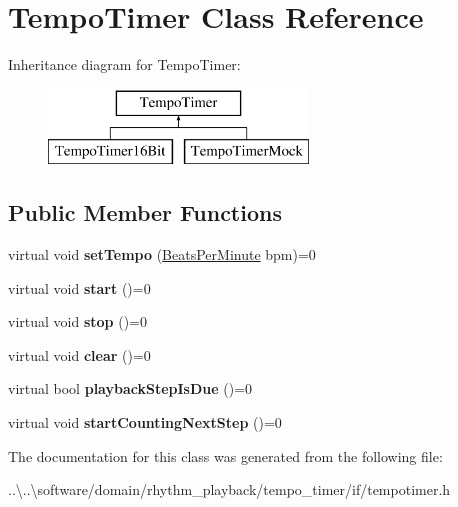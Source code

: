 \hypertarget{class_tempo_timer}{}\section{Tempo\+Timer Class Reference}
\label{class_tempo_timer}
Inheritance diagram for Tempo\+Timer\+:\begin{figure}[H]
\begin{center}
\leavevmode
\includegraphics[height=2.000000cm]{class_tempo_timer}
\end{center}
\end{figure}
\subsection*{Public Member Functions}
\begin{DoxyCompactItemize}
\item 
\mbox{\label{class_tempo_timer_a7becbb115ca987ae7629f6cb40f6824c}} 
virtual void {\bfseries set\+Tempo} (\mbox{\hyperlink{class_beats_per_minute}{Beats\+Per\+Minute}} bpm)=0
\item 
\mbox{\label{class_tempo_timer_aa33c53fa2a53e985d833c48a54a6b31c}} 
virtual void {\bfseries start} ()=0
\item 
\mbox{\label{class_tempo_timer_addd234d765f7b39bd26da5bc09bf9e0a}} 
virtual void {\bfseries stop} ()=0
\item 
\mbox{\label{class_tempo_timer_a2ae88d3a0e961dd42577b8b93e1ab6df}} 
virtual void {\bfseries clear} ()=0
\item 
\mbox{\label{class_tempo_timer_ac0241c95a4c094bf62aede38cf9de595}} 
virtual bool {\bfseries playback\+Step\+Is\+Due} ()=0
\item 
\mbox{\label{class_tempo_timer_a3758ecc82d1ceaec84076d1852275da3}} 
virtual void {\bfseries start\+Counting\+Next\+Step} ()=0
\end{DoxyCompactItemize}


The documentation for this class was generated from the following file\+:\begin{DoxyCompactItemize}
\item 
..\textbackslash{}..\textbackslash{}software/domain/rhythm\+\_\+playback/tempo\+\_\+timer/if/tempotimer.\+h\end{DoxyCompactItemize}

